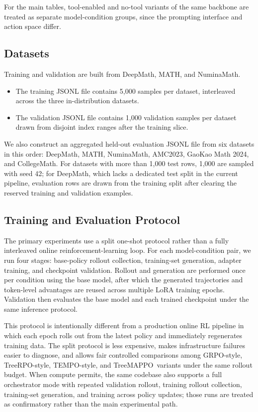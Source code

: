 \documentclass{article}
\newcommand{\ours}{TreeMAPPO}
\begin{document}
For the main tables, tool-enabled and no-tool variants of the same backbone are treated as separate model-condition groups, since the prompting interface and action space differ.

\subsection{Datasets}
Training and validation are built from DeepMath, MATH, and NuminaMath.
\begin{itemize}
    \item The training JSONL file contains 5{,}000 samples per dataset, interleaved across the three in-distribution datasets.
    \item The validation JSONL file contains 1{,}000 validation samples per dataset drawn from disjoint index ranges after the training slice.
\end{itemize}

We also construct an aggregated held-out evaluation JSONL file from six datasets in this order: DeepMath, MATH, NuminaMath, AMC2023, GaoKao Math 2024, and CollegeMath. For datasets with more than 1{,}000 test rows, 1{,}000 are sampled with seed 42; for DeepMath, which lacks a dedicated test split in the current pipeline, evaluation rows are drawn from the training split after clearing the reserved training and validation examples.


\subsection{Training and Evaluation Protocol}
The primary experiments use a split one-shot protocol rather than a fully interleaved online reinforcement-learning loop. For each model-condition pair, we run four stages: base-policy rollout collection, training-set generation, adapter training, and checkpoint validation. Rollout and generation are performed once per condition using the base model, after which the generated trajectories and token-level advantages are reused across multiple LoRA training epochs. Validation then evaluates the base model and each trained checkpoint under the same inference protocol.

This protocol is intentionally different from a production online RL pipeline in which each epoch rolls out from the latest policy and immediately regenerates training data. The split protocol is less expensive, makes infrastructure failures easier to diagnose, and allows fair controlled comparisons among GRPO-style, TreeRPO-style, TEMPO-style, and \ours\ variants under the same rollout budget. When compute permits, the same codebase also supports a full orchestrator mode with repeated validation rollout, training rollout collection, training-set generation, and training across policy updates; those runs are treated as confirmatory rather than the main experimental path.
\end{document}
